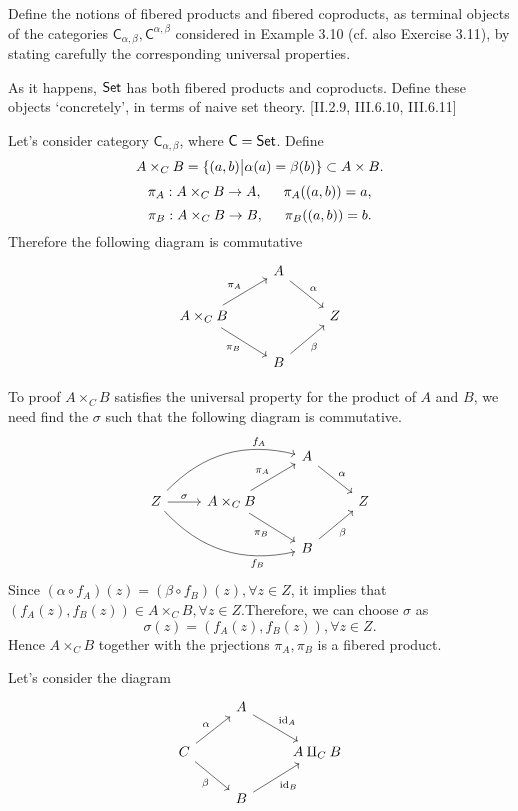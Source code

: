 \begin{problem}[5.12]
  Define the notions of fibered products and fibered coproducts, as terminal objects of the categories $\mathsf{C}_{\alpha,\beta},\mathsf{C}^{\alpha,\beta}$ considered in
  Example 3.10 (cf. also Exercise 3.11), by stating carefully the corresponding
  universal properties.

  As it happens, $\mathsf{Set}$ has both fibered products and coproducts. Define these
  objects `concretely', in terms of naive set theory. [II.2.9, III.6.10, III.6.11]
\end{problem}

\begin{solution}
Let's consider category $\mathsf{C}_{\alpha,\beta}$, where $\mathsf{C} = \mathsf{Set}$. Define 
$$A\times_{C} B = \{(a,b) \big{|} \alpha(a) = \beta(b)\}\subset A \times B.$$
$$\pi_A: A\times_{C} B \to A, \indent \pi_A((a,b)) = a,$$
$$\pi_B: A\times_{C} B \to B, \indent \pi_B((a,b)) = b.$$
Therefore the following diagram is commutative
%
\[
\begin{tikzcd}
& A \arrow[dr, "\alpha"]& \\
A\times_C B \arrow[ur, "\pi_A"] \arrow[dr, "\pi_B"'] & & Z\\
& B \arrow[ur, "\beta"'] &
\end{tikzcd}
\]

To proof $A\times_C B$ satisfies the universal property for the product of $A$ and $B$, we need 
find the $\sigma$ such that the following diagram is commutative.
%
\[
\begin{tikzcd}
& & A \arrow[dr, "\alpha"]& \\
Z\arrow[r, "\sigma"] \arrow[urr, bend left, "f_A" near end] \arrow[drr, bend right, "f_B"' near end] &A\times_C B \arrow[ur, "\pi_A"] \arrow[dr, "\pi_B"'] & & Z\\
&& B \arrow[ur, "\beta"'] &
\end{tikzcd}
\]
Since $(\alpha\circ f_A)(z) = (\beta\circ f_B)(z), \forall z\in Z$, it implies that $(f_A(z), f_B(z))\in A\times_C B,\forall z\in Z$.Therefore, we can choose $\sigma$ as $$\sigma(z) = (f_A(z), f_B(z)), \forall z\in Z.$$
Hence $A\times_C B$ together with the prjections $\pi_A,\pi_B$ is a fibered product.

Let's consider the diagram
%
\[
\begin{tikzcd}
& A \arrow[dr, "\text{id}_A"]& \\
C  \arrow[ur, "\alpha"] \arrow[dr, "\beta"'] & & A\amalg_{C} B\\
& B \arrow[ur, "\text{id}_B"'] &
\end{tikzcd}
\]


\end{solution}
